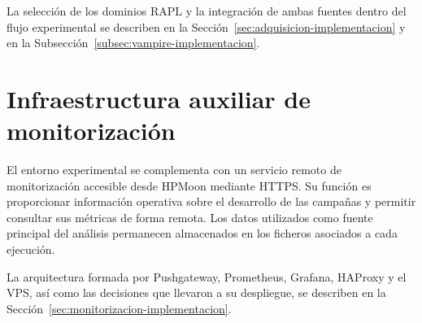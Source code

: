 La selección de los dominios RAPL y la integración de ambas fuentes dentro del flujo experimental se describen en la Sección~\ref{sec:adquisicion-implementacion} y en la Subsección~\ref{subsec:vampire-implementacion}.

\section{Infraestructura auxiliar de monitorización}
\label{sec:monitorizacion-entorno}

El entorno experimental se complementa con un servicio remoto de monitorización accesible desde HPMoon mediante HTTPS. Su función es proporcionar información operativa sobre el desarrollo de las campañas y permitir consultar sus métricas de forma remota. Los datos utilizados como fuente principal del análisis permanecen almacenados en los ficheros asociados a cada ejecución.

La arquitectura formada por Pushgateway, Prometheus, Grafana, HAProxy y el VPS, así como las decisiones que llevaron a su despliegue, se describen en la Sección~\ref{sec:monitorizacion-implementacion}.